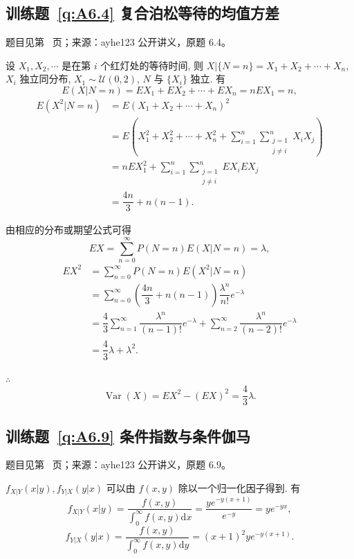 \documentclass[UTF8,12pt,a4paper,fontset=fandol]{ctexbook}
\begin{document}
\subsection*{训练题~\ref{q:A6.4} 复合泊松等待的均值方差}\label{a:A6.4}{\small 题目见第~\pageref{q:A6.4} 页；来源：ayhe123 公开讲义，原题 6.4。}
\begin{solve}
    设 $X_1,X_2,\cdots$ 是在第 $i$ 个红灯处的等待时间, 则 $X|\{N=n\}=X_1+X_2+\cdots+X_n$, $X_i$ 独立同分布, $X_1\sim\mathcal{U}(0,2)$, $N$ 与 $\{X_i\}$ 独立. 有
    \[E(X|N=n)=EX_1+EX_2+\cdots+EX_n=nEX_1=n,\]
    \begin{align*}
        E(X^2|N=n) & =E(X_1+X_2+\cdots+X_n)^2 \\
        & =E\left(X_1^2+X_2^2+\cdots+X_n^2+\sum\limits_{i=1}^n\sum\limits_{\substack{j=1\\j\neq i}}^nX_iX_j\right) \\
        & =nEX_1^2+\sum\limits_{i=1}^n\sum\limits_{\substack{j=1\\j\neq i}}^nEX_iEX_j \\
        & =\dfrac{4n}{3}+n(n-1).
    \end{align*}

    由相应的分布或期望公式可得
    \[EX=\sum\limits_{n=0}^\infty P(N=n)E(X|N=n)=\lambda,\]
    \begin{align*}
        EX^2 & =\sum\limits_{n=0}^\infty P(N=n)E(X^2|N=n) \\
        & =\sum\limits_{n=0}^\infty\left(\dfrac{4n}{3}+n(n-1)\right)\dfrac{\lambda^n}{n!}e^{-\lambda}  \\
        & =\dfrac{4}{3}\sum\limits_{n=1}^\infty\dfrac{\lambda^n}{(n-1)!}e^{-\lambda}+\sum\limits_{n=2}^\infty\dfrac{\lambda^n}{(n-2)!}e^{-\lambda}  \\
        & =\dfrac{4}{3}\lambda+\lambda^2.
    \end{align*}

    $\therefore$
    \[\operatorname{Var}(X)=EX^2-(EX)^2=\dfrac{4}{3}\lambda.\]
\end{solve}

\subsection*{训练题~\ref{q:A6.9} 条件指数与条件伽马}\label{a:A6.9}{\small 题目见第~\pageref{q:A6.9} 页；来源：ayhe123 公开讲义，原题 6.9。}
\begin{solve}
    $f_{X|Y}(x|y),f_{Y|X}(y|x)$ 可以由 $f(x,y)$ 除以一个归一化因子得到. 有
    \[f_{X|Y}(x|y)=\dfrac{f(x,y)}{\int_0^\infty f(x,y)\mathrm{d}x}=\dfrac{ye^{-y(x+1)}}{e^{-y}}=ye^{-yx},\]
    \[f_{Y|X}(y|x)=\dfrac{f(x,y)}{\int_0^\infty f(x,y)\mathrm{d}y}=(x+1)^2ye^{-y(x+1)}.\]
\end{solve}
\end{document}
